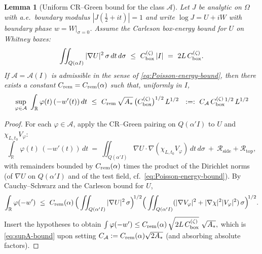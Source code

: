 \documentclass[11pt]{article}
\newtheorem{lemma}[theorem]{Lemma}
\theoremstyle{definition}
\theoremstyle{remark}
\theoremstyle{definition}
\newcommand{\R}{\mathbb{R}}
\begin{document}
\begin{lemma}[Uniform CR--Green bound for the class \(\mathcal A\)]\label{lem:uniform-CRG-A}
Let \(J\) be analytic on \(\Omega\) with a.e.\ boundary modulus \(|J(\tfrac12+it)|=1\) and write \(\log J=U+iW\) with boundary phase \(w=W|_{\sigma=0}\).
Assume the Carleson box-energy bound for \(U\) on Whitney boxes:
\[
  \iint_{Q(\alpha I)} |\nabla U|^2\,\sigma\,dt\,d\sigma \ \le\ C_{\rm box}^{(\zeta)}\,|I|\ =\ 2L\,C_{\rm box}^{(\zeta)}.
\]
If \(\mathcal A=\mathcal A(I)\) is admissible in the sense of \eqref{eq:Poisson-energy-bound},
then there exists a constant \(C_{\rm rem}=C_{\rm rem}(\alpha)\) such that, uniformly in \(I\),
\begin{equation}\label{eq:supA-bound}
  \sup_{\varphi\in\mathcal A}\ \int_{\R} \varphi(t)\,(-w'(t))\,dt
  \ \le\ C_{\rm rem}\,\sqrt{A_\ast}\,\big(C_{\rm box}^{(\zeta)}\big)^{1/2}\,L^{1/2}
  \ \ :=:\ C_{\mathcal A}\,C_{\rm box}^{(\zeta)}{}^{1/2}\,L^{1/2}
\end{equation}
\end{lemma}


\begin{proof}
For each \(\varphi\in\mathcal A\), apply the CR--Green pairing on \(Q(\alpha'I)\) to \(U\) and \(\chi_{L,t_0}V_\varphi\):
\[
  \int_{\R}\varphi(t)\,(-w'(t))\,dt
  \ =\ \iint_{Q(\alpha'I)} \nabla U\cdot\nabla(\chi_{L,t_0}V_\varphi)\,dt\,d\sigma\ +\ \mathcal R_{\mathrm{side}}+\mathcal R_{\mathrm{top}},
\]
with remainders bounded by \(C_{\rm rem}(\alpha)\) times the product of the Dirichlet norms
(of \(\nabla U\) on \(Q(\alpha'I)\) and of the test field, cf.\ \eqref{eq:Poisson-energy-bound}).
By Cauchy--Schwarz and the Carleson bound for \(U\),
\[
  \int_{\R}\varphi(-w') \ \le\ C_{\rm rem}(\alpha)\,
  \Big(\iint_{Q(\alpha'I)} |\nabla U|^2\,\sigma\Big)^{\!1/2}
  \Big(\iint_{Q(\alpha'I)} (|\nabla V_\varphi|^2+|\nabla\chi|^2|V_\varphi|^2)\,\sigma\Big)^{\!1/2}.
\]
Insert the hypotheses to obtain
\(
\int \varphi(-w') \le C_{\rm rem}(\alpha)\,\sqrt{2L\,C_{\rm box}^{(\zeta)}}\ \sqrt{A_\ast},
\)
which is \eqref{eq:supA-bound} upon setting \(C_{\mathcal A}:=C_{\rm rem}(\alpha)\sqrt{2A_\ast}\) (and absorbing absolute factors).
\end{proof}
\end{document}
